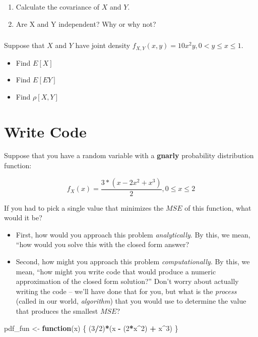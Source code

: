 \documentclass[
]{book}
\newenvironment{Shaded}{\begin{snugshade}}{\end{snugshade}}
\newcommand{\ControlFlowTok}[1]{\textcolor[rgb]{0.13,0.29,0.53}{\textbf{#1}}}
\newcommand{\DecValTok}[1]{\textcolor[rgb]{0.00,0.00,0.81}{#1}}
\newcommand{\NormalTok}[1]{#1}
\newcommand{\OtherTok}[1]{\textcolor[rgb]{0.56,0.35,0.01}{#1}}
\newcommand{\SpecialCharTok}[1]{\textcolor[rgb]{0.81,0.36,0.00}{\textbf{#1}}}
\providecommand{\tightlist}{%
  \setlength{\itemsep}{0pt}\setlength{\parskip}{0pt}}
\theoremstyle{definition}
\theoremstyle{definition}
\theoremstyle{definition}
\theoremstyle{definition}
\theoremstyle{remark}
\begin{document}
\begin{enumerate}
\def\labelenumi{\arabic{enumi}.}
\tightlist
\item
  Calculate the covariance of \(X\) and \(Y\).
\item
  Are X and Y independent? Why or why not?
\end{enumerate}

\subsubsection{}\label{section}

Suppose that \(X\) and \(Y\) have joint density \(f_{X,Y}(x,y) = 10 x^2y, 0 < y \leq x \leq 1.\)

\begin{itemize}
\tightlist
\item
  Find \(E[X]\)
\item
  Find \(E[EY]\)
\item
  Find \(\rho[X,Y]\)
\end{itemize}

\section{Write Code}\label{write-code}

Suppose that you have a random variable with a \textbf{gnarly} probability distribution function:

\[ 
  f_{X}(x) = \frac{3*\left(x - 2x^2 + x^3\right)}{2}, 0\leq x\leq 2
\]

If you had to pick a single value that minimizes the \(MSE\) of this function, what would it be?

\begin{itemize}
\tightlist
\item
  First, how would you approach this problem \emph{analytically}. By this, we mean, ``how would you solve this with the closed form answer?
\item
  Second, how might you approach this problem \emph{computationally}. By this, we mean, ``how might you write code that would produce a numeric approximation of the closed form solution?'' Don't worry about actually writing the code -- we'll have done that for you, but what is the \emph{process} (called in our world, \emph{algorithm}) that you would use to determine the value that produces the smallest \(MSE\)?
\end{itemize}

\begin{Shaded}
\begin{Highlighting}[]
\NormalTok{pdf\_fun }\OtherTok{\textless{}{-}} \ControlFlowTok{function}\NormalTok{(x) \{ }
\NormalTok{  (}\DecValTok{3}\SpecialCharTok{/}\DecValTok{2}\NormalTok{)}\SpecialCharTok{*}\NormalTok{(x }\SpecialCharTok{{-}}\NormalTok{ (}\DecValTok{2}\SpecialCharTok{*}\NormalTok{x}\SpecialCharTok{\^{}}\DecValTok{2}\NormalTok{) }\SpecialCharTok{+}\NormalTok{ x}\SpecialCharTok{\^{}}\DecValTok{3}\NormalTok{)}
\NormalTok{\}}
\end{Highlighting}
\end{Shaded}
\end{document}
